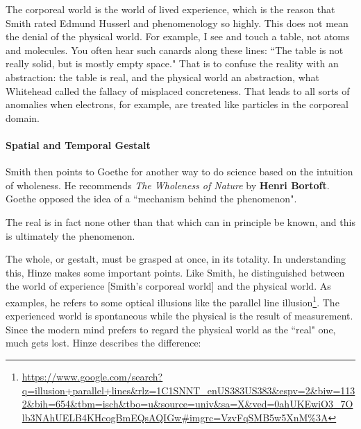 The corporeal world is the world of lived experience, which is the reason that Smith rated Edmund Husserl and phenomenology so highly. This does not mean the denial of the physical world. For example, I see and touch a table, not atoms and molecules. You often hear such canards along these lines: ``The table is not really solid, but is mostly empty space." That is to confuse the reality with an abstraction: the table is real, and the physical world an abstraction, what Whitehead called the fallacy of misplaced concreteness. That leads to all sorts of anomalies when electrons, for example, are treated like particles in the corporeal domain.

\paragraph{Spatial and Temporal Gestalt}
Smith then points to Goethe for another way to do science based on the intuition of wholeness. He recommends \emph{The Wholeness of Nature} by \textbf{Henri Bortoft}. Goethe opposed the idea of a ``mechanism behind the phenomenon".

\begin{quotex}
The real is in fact none other than that which can in principle be known, and this is ultimately the phenomenon. 

\end{quotex}
The whole, or gestalt, must be grasped at once, in its totality. In understanding this, Hinze makes some important points. Like Smith, he distinguished between the world of experience [Smith's corporeal world] and the physical world. As examples, he refers to some optical illusions like the parallel line illusion\footnote{\url{https://www.google.com/search?q=illusion+parallel+lines\&rlz=1C1SNNT_enUS383US383\&espv=2\&biw=1132\&bih=654\&tbm=isch\&tbo=u\&source=univ\&sa=X\&ved=0ahUKEwiO3_7Olb3NAhUELB4KHcogBmEQsAQIGw\#imgrc=VzvFqSMB5w5XnM\%3A}}. The experienced world is spontaneous while the physical is the result of measurement. Since the modern mind prefers to regard the physical world as the ``real" one, much gets lost. Hinze describes the difference:

